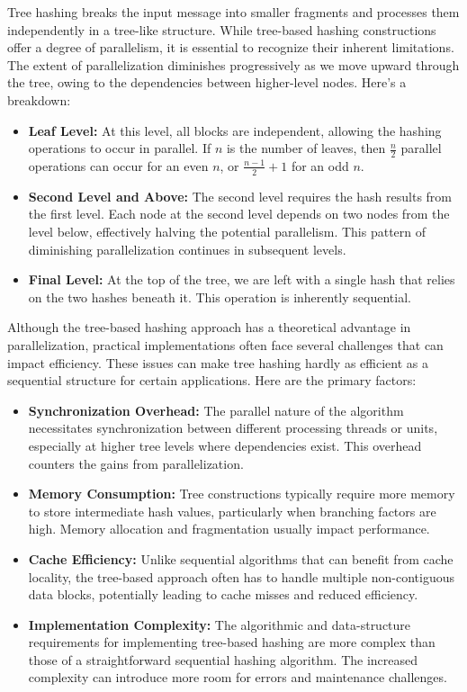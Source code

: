 \documentclass[10pt]{article}
\begin{document}
Tree hashing breaks the input message into smaller fragments and processes them independently in a tree-like structure.
While tree-based hashing constructions offer a degree of parallelism, it is essential to recognize their inherent limitations. The extent of parallelization diminishes progressively as we move upward through the tree, owing to the dependencies between higher-level nodes. Here's a breakdown:

\begin{itemize}
\item \textbf{Leaf Level:} At this level, all blocks are independent, allowing the hashing operations to occur in parallel. If \( n \) is the number of leaves, then \( \frac{n}{2} \) parallel operations can occur for an even \( n \), or \( \frac{n-1}{2} + 1 \) for an odd \( n \).
\item \textbf{Second Level and Above:} The second level requires the hash results from the first level. Each node at the second level depends on two nodes from the level below, effectively halving the potential parallelism. This pattern of diminishing parallelization continues in subsequent levels.
\item \textbf{Final Level:} At the top of the tree, we are left with a single hash that relies on the two hashes beneath it. This operation is inherently sequential.
\end{itemize}

Although the tree-based hashing approach has a theoretical advantage in parallelization, practical implementations often face several challenges that can impact efficiency. These issues can make tree hashing hardly as efficient as a sequential structure for certain applications. Here are the primary factors:

\begin{itemize}
\item \textbf{Synchronization Overhead:} The parallel nature of the algorithm necessitates synchronization between different processing threads or units, especially at higher tree levels where dependencies exist. This overhead counters the gains from parallelization.
\item \textbf{Memory Consumption:} Tree constructions typically require more memory to store intermediate hash values, particularly when branching factors are high. Memory allocation and fragmentation usually impact performance.
\item \textbf{Cache Efficiency:} Unlike sequential algorithms that can benefit from cache locality, the tree-based approach often has to handle multiple non-contiguous data blocks, potentially leading to cache misses and reduced efficiency.
\item \textbf{Implementation Complexity:} The algorithmic and data-structure requirements for implementing tree-based hashing are more complex than those of a straightforward sequential hashing algorithm. The increased complexity can introduce more room for errors and maintenance challenges.
\end{itemize}
\end{document}
